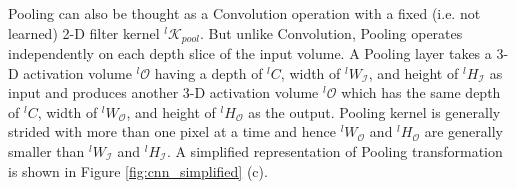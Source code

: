 Pooling can also be thought as a Convolution operation with a fixed (i.e. not learned) 2-D filter kernel $^l\mathcal{K}_{pool}$.
But unlike Convolution, Pooling operates independently on each depth slice of the input volume.
A Pooling layer takes a 3-D activation volume $^l\mathcal{O}$ having a depth of $^lC$, width of $^lW_{\mathcal{I}}$, and height of $^lH_{\mathcal{I}}$ as input and produces another 3-D activation volume $^l\mathcal{O}$ which has the same depth of $^lC$, width of $^lW_{\mathcal{O}}$, and height of $^lH_{\mathcal{O}}$ as the output.
Pooling kernel is generally strided with more than one pixel at a time and hence $^lW_{\mathcal{O}}$ and $^lH_{\mathcal{O}}$ are generally smaller than $^lW_{\mathcal{I}}$ and $^lH_{\mathcal{I}}$.
A simplified representation of Pooling transformation is shown in Figure \ref{fig:cnn_simplified} (c).




